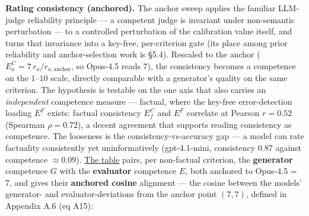 \textbf{Rating consistency (anchored).} The anchor sweep applies the familiar LLM-judge reliability principle --- a competent judge is invariant under non-semantic perturbation --- to a controlled perturbation of the calibration value itself, and turns that invariance into a key-free, per-criterion gate (its place among prior reliability and anchor-selection work is §5.4). Rescaled to the anchor (\(E^{C}_a = 7\,r_a/r_{a,\text{anchor}}\), so Opus-4.5 reads 7), the consistency becomes a competence on the \(1\)--\(10\) scale, directly comparable with a generator's quality on the same criterion. The hypothesis is testable on the one axis that also carries an \emph{independent} competence measure --- factual, where the key-free error-detection loading \(E^{F}\) exists: factual consistency \(E^{C}_f\) and \(E^{F}\) correlate at Pearson \(r = 0.52\) (Spearman \(\rho = 0.72\)), a decent agreement that supports reading consistency as competence. The looseness is the consistency-vs-accuracy gap --- a model can rate factuality consistently yet uninformatively (gpt-4.1-mini, consistency \(0.87\) against competence \(\approx 0.09\)). \hyperref[tab-per-criterion]{The table} pairs, per non-factual criterion, the \textbf{generator} competence \(G\) with the \textbf{evaluator} competence \(E\), both anchored to Opus-4.5 = 7, and gives their \textbf{anchored cosine} alignment --- the cosine between the models' generator- and evaluator-deviations from the anchor point \((7,7)\), defined in Appendix A.6 (eq A15):

\protect{}\label{tab-per-criterion}{}

